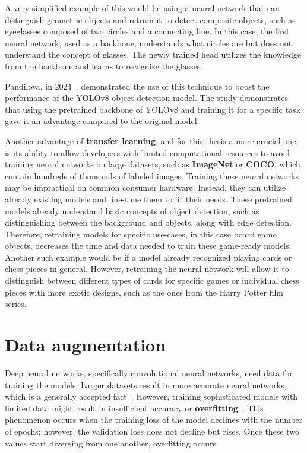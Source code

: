 A very simplified example of this would be using a neural network that can distinguish geometric objects and retrain it to detect composite objects, such as eyeglasses composed of two circles and a connecting line. In this case, the first neural network, used as a backbone, understands what circles are but does not understand the concept of glasses. The newly trained head utilizes the knowledge from the backbone and learns to recognize the glasses.

Pandilova, in 2024~\cite{pandilova2024transfer}, demonstrated the use of this technique to boost the performance of the YOLOv8 object detection model. The study demonstrates that using the pretrained backbone of YOLOv8 and training it for a specific task gave it an advantage compared to the original model.

Another advantage of \textbf{transfer learning}, and for this thesis a more crucial one, is its ability to allow developers with limited computational resources to avoid training neural networks on large datasets, such as \textbf{ImageNet} or \textbf{COCO}, which contain hundreds of thousands of labeled images. Training these neural networks may be impractical on common consumer hardware. Instead, they can utilize already existing models and fine-tune them to fit their needs. These pretrained models already understand basic concepts of object detection, such as distinguishing between the background and objects, along with edge detection. Therefore, retraining models for specific use-cases, in this case board game objects, decreases the time and data needed to train these game-ready models. Another such example would be if a model already recognized playing cards or chess pieces in general. However, retraining the neural network will allow it to distinguish between different types of cards for specific games or individual chess pieces with more exotic designs, such as the ones from the Harry Potter film series.




\section{Data augmentation}
\label{dataAugmentation}
Deep neural networks, specifically convolutional neural networks, need data for training the models. Larger datasets result in more accurate neural networks, which is a generally accepted fact~\cite{dataAugmentation2}. However, training sophisticated models with limited data might result in insufficient accuracy or \textbf{overfitting}~\cite{dataAugmentation1}. This phenomenon occurs when the training loss of the model declines with the number of epochs; however, the validation loss does not decline but rises. Once these two values start diverging from one another, overfitting occurs.

